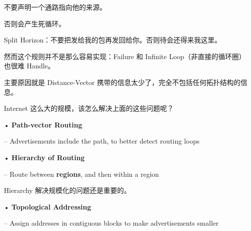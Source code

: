 \documentclass[
]{article}
\begin{document}
不要声明一个通路指向他的来源。

否则会产生死循环。

Split Horizon：不要把发给我的包再发回给你。否则待会还得来我这里。

然而这个规则并不是那么容易实现：Failure 和 Infinite
Loop（非直接的循环圈）也很难 Handle。

主要原因就是 Distance-Vector
携带的信息太少了，完全不包括任何拓扑结构的信息。

Internet 这么大的规模，该怎么解决上面的这些问题呢？

• \textbf{Path-vector Routing}

-- Advertisements include the path, to better detect routing loops

• \textbf{Hierarchy of Routing}

-- Route between \textbf{regions}, and then within a region

Hierarchy 解决规模化的问题还是重要的。

• \textbf{Topological Addressing}

-- Assign addresses in contiguous blocks to make advertisements smaller
\end{document}
